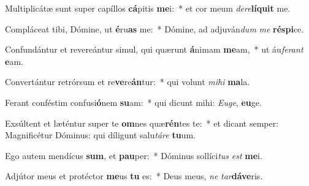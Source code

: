 \item Multiplicátæ sunt super capíllos \textbf{cá}pitis \textbf{me}i:~* et cor meum \textit{de}\textit{re}\textbf{lí}\textbf{quit} me.
\item Compláceat tibi, Dómine, ut \textbf{é}ru\textbf{as} me:~* Dómine, ad adjuván\textit{dum} \textit{me} \textbf{ré}\textbf{spi}ce.
\item Confundántur et revereántur simul, qui quærunt \textbf{á}nimam \textbf{me}am,~* ut áu\textit{fe}\textit{rant} \textbf{e}am.
\item Convertántur retrórsum et re\textbf{ve}re\textbf{án}tur:~* qui volunt \textit{mi}\textit{hi} \textbf{ma}la.
\item Ferant conféstim confusi\textbf{ó}nem \textbf{su}am:~* qui dicunt mihi: \textit{Eu}\textit{ge}, \textbf{eu}ge.
\item Exsúltent et læténtur super te \textbf{om}nes quæ\textbf{rén}tes te:~* et dicant semper: Magnificétur Dóminus: qui díligunt salu\textit{tá}\textit{re} \textbf{tu}um.
\item Ego autem mendícus \textbf{sum}, et \textbf{pau}per:~* Dóminus sollíci\textit{tus} \textit{est} \textbf{me}i.
\item Adjútor meus et protéctor \textbf{me}us \textbf{tu} es:~* Deus meus, \textit{ne} \textit{tar}\textbf{dá}\textbf{ve}ris.
